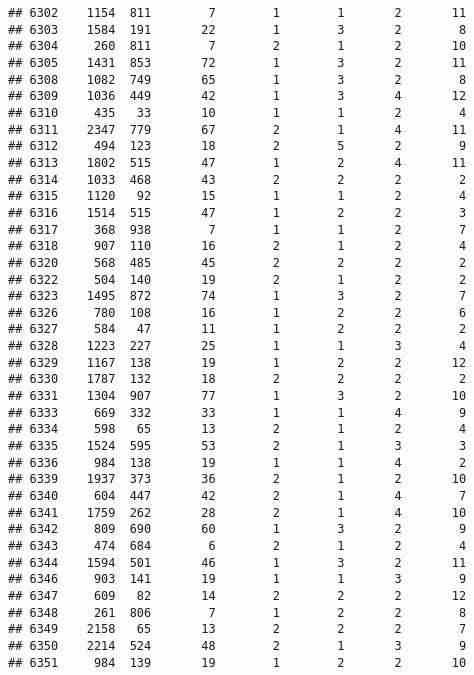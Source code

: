 \documentclass[]{article}
\begin{document}
\begin{verbatim}
## 6302    1154  811        7        1        1       2       11
## 6303    1584  191       22        1        3       2        8
## 6304     260  811        7        2        1       2       10
## 6305    1431  853       72        1        3       2       11
## 6308    1082  749       65        1        3       2        8
## 6309    1036  449       42        1        3       4       12
## 6310     435   33       10        1        1       2        4
## 6311    2347  779       67        2        1       4       11
## 6312     494  123       18        2        5       2        9
## 6313    1802  515       47        1        2       4       11
## 6314    1033  468       43        2        2       2        2
## 6315    1120   92       15        1        1       2        4
## 6316    1514  515       47        1        2       2        3
## 6317     368  938        7        1        1       2        7
## 6318     907  110       16        2        1       2        4
## 6320     568  485       45        2        2       2        2
## 6322     504  140       19        2        1       2        2
## 6323    1495  872       74        1        3       2        7
## 6326     780  108       16        1        2       2        6
## 6327     584   47       11        1        2       2        2
## 6328    1223  227       25        1        1       3        4
## 6329    1167  138       19        1        2       2       12
## 6330    1787  132       18        2        2       2        2
## 6331    1304  907       77        1        3       2       10
## 6333     669  332       33        1        1       4        9
## 6334     598   65       13        2        1       2        4
## 6335    1524  595       53        2        1       3        3
## 6336     984  138       19        1        1       4        2
## 6339    1937  373       36        2        1       2       10
## 6340     604  447       42        2        1       4        7
## 6341    1759  262       28        2        1       4       10
## 6342     809  690       60        1        3       2        9
## 6343     474  684        6        2        1       2        4
## 6344    1594  501       46        1        3       2       11
## 6346     903  141       19        1        1       3        9
## 6347     609   82       14        2        2       2       12
## 6348     261  806        7        1        2       2        8
## 6349    2158   65       13        2        2       2        7
## 6350    2214  524       48        2        1       3        9
## 6351     984  139       19        1        2       2       10

\end{verbatim}
\end{document}
